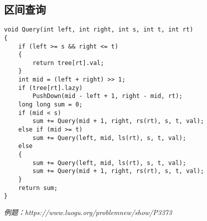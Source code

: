 \subsection{区间查询}
\begin{lstlisting}
void Query(int left, int right, int s, int t, int rt)
{
    if (left >= s && right <= t)
    {
        return tree[rt].val;
    }
    int mid = (left + right) >> 1;
    if (tree[rt].lazy)
        PushDown(mid - left + 1, right - mid, rt);
    long long sum = 0;
    if (mid < s)
        sum += Query(mid + 1, right, rs(rt), s, t, val);
    else if (mid >= t)
        sum += Query(left, mid, ls(rt), s, t, val);
    else
    {
        sum += Query(left, mid, ls(rt), s, t, val);
        sum += Query(mid + 1, right, rs(rt), s, t, val);
    }
    return sum;
}
\end{lstlisting}
\emph{例题：https://www.luogu.org/problemnew/show/P3373}